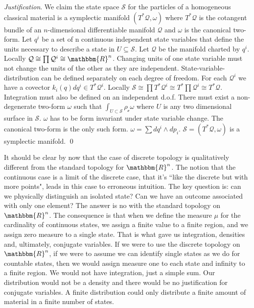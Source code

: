 \documentclass[aps,pra,10pt,twocolumn,floatfix,nofootinbib]{revtex4-1}
\numberwithin{equation}{section}
\theoremstyle{definition}
\newenvironment{justification}{\emph{Justification}.}{\qed}
\begin{document}
\begin{justification}
	We claim the state space $\mathcal{S}$ for the particles of a homogeneous classical material is a symplectic manifold $(T^*\mathcal{Q}, \omega)$ where $T^*\mathcal{Q}$ is the cotangent bundle of an $n$-dimensional differentiable manifold $\mathcal{Q}$ and $\omega$ is the canonical two-form. Let $q^i$ be a set of n continuous independent state variables that define the units necessary to describe a state in $U \subseteq \mathcal{S}$. Let $\mathcal{Q}$ be the manifold charted by $q^i$. Locally $\mathcal{Q} \cong \prod \mathcal{Q}^i \cong \mathbbm{R}^n$. Changing units of one state variable must not change the units of the other as they are independent. State-variable-distribution can  be defined separately on each degree of freedom. For each $\mathcal{Q}^i$ we have a covector $k_i(q) dq^i \in T^*\mathcal{Q}^i$. Locally $\mathcal{S} \cong \prod T^*\mathcal{Q}^i \cong T^* \prod \mathcal{Q}^i \cong T^* \mathcal{Q}$. Integration must also be defined on an independent d.o.f. There must exist a non-degenerate two-form $\omega$ such that $\int_{U \subset \mathcal{S}} \rho_\mathcal{c} \omega$ where $U$ is any two dimensional surface in $\mathcal{S}$. $\omega$ has to be form invariant under state variable change. The canonical two-form is the only such form. $\omega = \sum dq^i \wedge dp_i$. $\mathcal{S} = (T^*\mathcal{Q}, \omega)$ is a symplectic manifold.
\end{justification}

It should be clear by now that the case of discrete topology is qualitatively different from the standard topology for $\mathbbm{R}^n$. The notion that the continuous case is a limit of the discrete case, that it's ``like the discrete but with more points", leads in this case to erroneous intuition. The key question is: can we physically distinguish an isolated state? Can we have an outcome associated with only one element? The answer is no with the standard topology on $\mathbbm{R}^n$. The consequence is that when we define the measure $\mu$ for the cardinality of continuous states, we assign a finite value to a finite region, and we assign zero measure to a single state. That is what gave us integration, densities and, ultimately, conjugate variables. If we were to use the discrete topology on $\mathbbm{R}^n$, if we were to assume we can identify single states as we do for countable states, then we would assign measure one to each state and infinity to a finite region. We would not have integration, just a simple sum. Our distribution would not be a density and there would be no justification for conjugate variables. A finite distribution could only distribute a finite amount of material in a finite number of states.
\end{document}
